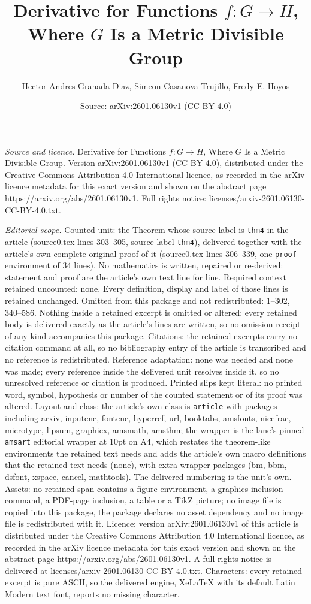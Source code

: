\documentclass[10pt,a4paper]{amsart}
\title[Derivative for Functions $f : G \to H$, Where $G$ Is a Metri]{Derivative for Functions $f : G \to H$, Where $G$ Is a Metric Divisible Group}
\author{Hector Andres Granada Diaz, Simeon Casanova Trujillo, Fredy E. Hoyos}
\date{Source: arXiv:2601.06130v1 (CC BY 4.0)}
\begin{document}
\maketitle

\noindent\emph{Source and licence.} Derivative for Functions $f : G \to H$, Where $G$ Is a Metric Divisible Group. Version arXiv:2601.06130v1 (CC BY 4.0), distributed under the Creative Commons Attribution 4.0 International licence, as recorded in the arXiv licence metadata for this exact version and shown on the abstract page https://arxiv.org/abs/2601.06130v1. Full rights notice: licenses/arxiv-2601.06130-CC-BY-4.0.txt.\par\smallskip

\noindent\textit{Editorial scope.} Counted unit: the Theorem whose source label is \texttt{thm4} in the article (source0.tex lines 303--305, source label \texttt{thm4}), delivered together with the article's own complete original proof of it (source0.tex lines 306--339, one \texttt{proof} environment of 34 lines). No mathematics is written, repaired or re-derived: statement and proof are the article's own text line for line. Required context retained uncounted: none. Every definition, display and label of those lines is retained unchanged. Omitted from this package and not redistributed: 1--302, 340--586. Nothing inside a retained excerpt is omitted or altered: every retained body is delivered exactly as the article's lines are written, so no omission receipt of any kind accompanies this package. Citations: the retained excerpts carry no citation command at all, so no bibliography entry of the article is transcribed and no reference is redistributed. Reference adaptation: none was needed and none was made; every reference inside the delivered unit resolves inside it, so no unresolved reference or citation is produced. Printed slips kept literal: no printed word, symbol, hypothesis or number of the counted statement or of its proof was altered. Layout and class: the article's own class is \texttt{article} with packages including arxiv, inputenc, fontenc, hyperref, url, booktabs, amsfonts, nicefrac, microtype, lipsum, graphicx, amsmath, amsthm; the wrapper is the lane's pinned \texttt{amsart} editorial wrapper at 10pt on A4, which restates the theorem-like environments the retained text needs and adds the article's own macro definitions that the retained text needs (none), with extra wrapper packages (bm, bbm, dsfont, xspace, cancel, mathtools). The delivered numbering is the unit's own. Assets: no retained span contains a figure environment, a graphics-inclusion command, a PDF-page inclusion, a table or a TikZ picture; no image file is copied into this package, the package declares no asset dependency and no image file is redistributed with it. Licence: version arXiv:2601.06130v1 of this article is distributed under the Creative Commons Attribution 4.0 International licence, as recorded in the arXiv licence metadata for this exact version and shown on the abstract page https://arxiv.org/abs/2601.06130v1. A full rights notice is delivered at licenses/arxiv-2601.06130-CC-BY-4.0.txt. Characters: every retained excerpt is pure ASCII, so the delivered engine, XeLaTeX with its default Latin Modern text font, reports no missing character.
\end{document}

